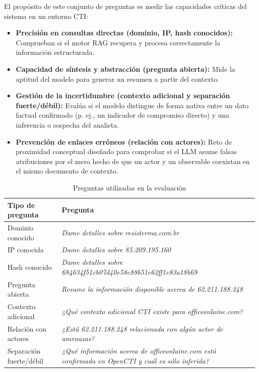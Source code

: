 \documentclass[12pt]{report}
\begin{document}
El propósito de este conjunto de preguntas es medir las capacidades críticas del sistema en un entorno CTI:
\begin{itemize}
	\item \textbf{Precisión en consultas directas (dominio, IP, hash conocidos):} Comprueban si el motor RAG recupera y procesa correctamente la información estructurada.
	\item \textbf{Capacidad de síntesis y abstracción (pregunta abierta):} Mide la aptitud del modelo para generar un resumen a partir del contexto.
	\item \textbf{Gestión de la incertidumbre (contexto adicional y separación fuerte/débil):} Evalúa si el modelo distingue de forma nativa entre un dato factual confirmado (p. ej., un indicador de compromiso directo) y una inferencia o sospecha del analista.
	\item \textbf{Prevención de enlaces erróneos (relación con actores):} Reto de proximidad conceptual diseñado para comprobar si el LLM asume falsas atribuciones por el mero hecho de que un actor y un observable coexistan en el mismo documento de contexto.
\end{itemize}

\begin{table}[H]
	\centering
	\small
	\begin{tabular}{ l p{11cm} }
		\toprule
		\textbf{Tipo de pregunta} & \textbf{Pregunta} \\
		\midrule		
		Dominio conocido & \textit{Dame detalles sobre resisterma.com.br} \\
		IP conocida & \textit{Dame detalles sobre 85.209.195.160} \\
		Hash conocido & \textit{Dame detalles sobre 684634f51cb07d40e58c88b51c62ff1c83a18b69} \\
		Pregunta abierta & \textit{Resume la información disponible acerca de 62.211.188.248} \\
		Contexto adicional & \textit{¿Qué contexto adicional CTI existe para officeonlaine.com?} \\
		Relación con actores & \textit{¿Está 62.211.188.248 relacionada con algún actor de amenazas?} \\
		Separación fuerte/débil &\textit{ ¿Qué información acerca de officeonlaine.com está confirmada en OpenCTI y cuál es sólo inferida?}\\
		\bottomrule
	\end{tabular}
	\caption{Preguntas utilizadas en la evaluación}
	\label{tab:preguntas-evaluacion}
\end{table}
\end{document}
